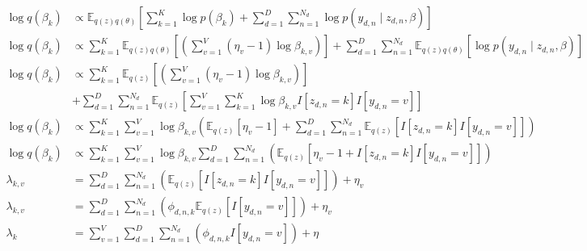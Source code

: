 \documentclass [12pt]{article}
\newcommand{\E}{\ensuremath{\mathbb{E}}}
\begin{document}
\begin{itemize}
\begin{align*}
    \log q(\beta_k) &\propto \E_{q(z)q(\theta)}\left[ \sum_{k=1}^K \log p(\beta_k) + \sum_{d=1}^D \sum_{n=1}^{N_d} \log p(y_{d,n} \mid z_{d,n}, \beta) \right] \\
    \log q(\beta_k) &\propto \sum_{k=1}^K \E_{q(z)q(\theta)}\left[  \left( \sum_{v=1}^V (\eta_{v} -1 ) \log \beta_{k,v}\right)\right] + \sum_{d=1}^D \sum_{n=1}^{N_d} \E_{q(z)q(\theta)}\left[ \log p(y_{d,n} \mid z_{d,n}, \beta) \right] \\
    \log q(\beta_k) &\propto \sum_{k=1}^K \E_{q(z)}\left[  \left( \sum_{v=1}^V (\eta_{v} -1 ) \log \beta_{k,v}\right)\right] \\ &+ \sum_{d=1}^D \sum_{n=1}^{N_d} \E_{q(z)}\left[ \sum_{v=1}^{V} \sum_{k=1}^{K} \log \beta_{k,v} I[z_{d,n} = k ] I[y_{d,n} = v] \right] \\
    \log q(\beta_k) &\propto \sum_{k=1}^K \sum_{v=1}^V \log \beta_{k,v} \left( \E_{q(z)}\left[\eta_{v} -1 \right] + \sum_{d=1}^D \sum_{n=1}^{N_d} \E_{q(z)}\left[ I[z_{d,n} = k ] I[y_{d,n} = v] \right] \right) \\
     \log q(\beta_k) &\propto \sum_{k=1}^K \sum_{v=1}^V \log \beta_{k,v} \sum_{d=1}^D \sum_{n=1}^{N_d}\left( \E_{q(z)}\left[\eta_{v} -1 +  I[z_{d,n} = k ] I[y_{d,n} = v] \right] \right) \\
    \lambda_{k,v} &= \sum_{d=1}^D \sum_{n=1}^{N_d}\left( \E_{q(z)}\left[  I[z_{d,n} = k ] I[y_{d,n} = v] \right]\right) + \eta_{v} \\
    \lambda_{k,v} &= \sum_{d=1}^D \sum_{n=1}^{N_d}\left( \phi_{d,n,k} \E_{q(z)}\left[ I[y_{d,n} = v] \right]\right) + \eta_{v} \\
    \lambda_{k} &= \sum_{v=1}^{V} \sum_{d=1}^D \sum_{n=1}^{N_d}\left( \phi_{d,n,k} I[y_{d,n} = v] \right) + \eta 
\end{align*}





\end{itemize}
\end{document}
